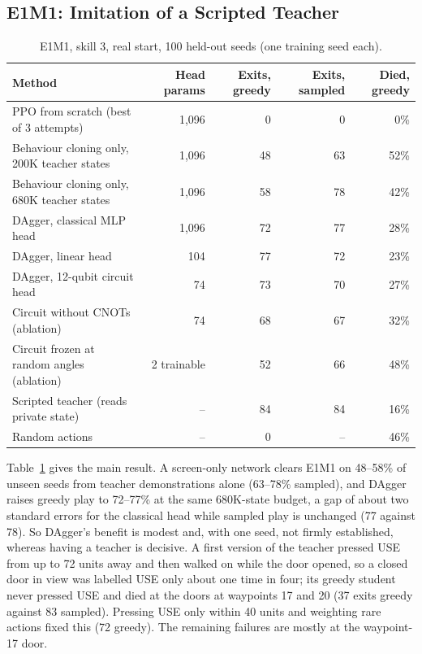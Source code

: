 \documentclass[10pt, a4paper]{article}
\begin{document}
\subsection{E1M1: Imitation of a Scripted Teacher}
\begin{table}[htbp]
\centering
\footnotesize
\renewcommand{\arraystretch}{1.1}
\caption{E1M1, skill 3, real start, 100 held-out seeds (one training seed each).}
\label{tab:e1m1}
\begin{tabularx}{\textwidth}{Xrrrr}
\toprule
\textbf{Method} & \textbf{Head params} & \textbf{Exits, greedy} & \textbf{Exits, sampled} & \textbf{Died, greedy} \\
\midrule
PPO from scratch (best of 3 attempts) & 1,096 & 0 & 0 & 0\% \\
Behaviour cloning only, 200K teacher states & 1,096 & 48 & 63 & 52\% \\
Behaviour cloning only, 680K teacher states & 1,096 & 58 & 78 & 42\% \\
DAgger, classical MLP head & 1,096 & 72 & 77 & 28\% \\
DAgger, linear head & 104 & 77 & 72 & 23\% \\
DAgger, 12-qubit circuit head & 74 & 73 & 70 & 27\% \\
Circuit without CNOTs (ablation) & 74 & 68 & 67 & 32\% \\
Circuit frozen at random angles (ablation) & 2 trainable & 52 & 66 & 48\% \\
Scripted teacher (reads private state) & -- & 84 & 84 & 16\% \\
Random actions & -- & 0 & -- & 46\% \\
\bottomrule
\end{tabularx}
\end{table}

Table~\ref{tab:e1m1} gives the main result. A screen-only network clears E1M1 on 48--58\% of unseen seeds from teacher demonstrations alone (63--78\% sampled), and DAgger raises greedy play to 72--77\% at the same 680K-state budget, a gap of about two standard errors for the classical head while sampled play is unchanged (77 against 78). So DAgger's benefit is modest and, with one seed, not firmly established, whereas having a teacher is decisive. A first version of the teacher pressed USE from up to 72 units away and then walked on while the door opened, so a closed door in view was labelled USE only about one time in four; its greedy student never pressed USE and died at the doors at waypoints 17 and 20 (37 exits greedy against 83 sampled). Pressing USE only within 40 units and weighting rare actions fixed this (72 greedy). The remaining failures are mostly at the waypoint-17 door.
\end{document}

